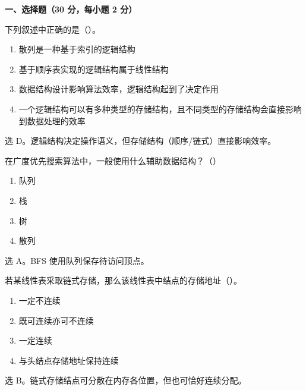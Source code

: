 
\textbf{一、选择题（30 分，每小题 2 分）}

\begin{question}
下列叙述中正确的是（\quad）。
\begin{enumerate}
  \item 散列是一种基于索引的逻辑结构
  \item 基于顺序表实现的逻辑结构属于线性结构
  \item 数据结构设计影响算法效率，逻辑结构起到了决定作用
  \item 一个逻辑结构可以有多种类型的存储结构，且不同类型的存储结构会直接影响到数据处理的效率
\end{enumerate}
\begin{solution}
选 D。逻辑结构决定操作语义，但存储结构（顺序/链式）直接影响效率。
\end{solution}
\end{question}

\begin{question}
在广度优先搜索算法中，一般使用什么辅助数据结构？（\quad）
\begin{enumerate}
  \item 队列
  \item 栈
  \item 树
  \item 散列
\end{enumerate}
\begin{solution}
选 A。BFS 使用队列保存待访问顶点。
\end{solution}
\end{question}

\begin{question}
若某线性表采取链式存储，那么该线性表中结点的存储地址（\quad）。
\begin{enumerate}
  \item 一定不连续
  \item 既可连续亦可不连续
  \item 一定连续
  \item 与头结点存储地址保持连续
\end{enumerate}
\begin{solution}
选 B。链式存储结点可分散在内存各位置，但也可恰好连续分配。
\end{solution}
\end{question}

